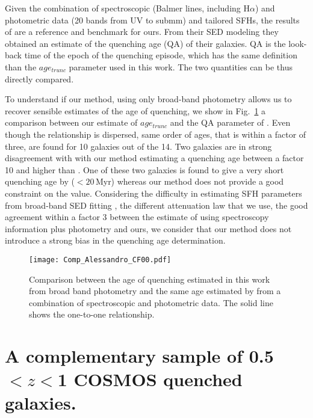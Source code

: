 \documentclass[traditabstract]{aa} %
\begin{document}
Given the combination of spectroscopic (Balmer lines, including H$\alpha$) and photometric data (20 bands from UV to submm) and tailored SFHs, the results of \cite{Boselli16} are a reference and benchmark for ours.
From their SED modeling they obtained an estimate of the quenching age (QA) of their galaxies.
QA is the look-back time of the epoch of the quenching episode, which has the same definition than the $age_{trunc}$ parameter used in this work.
The two quantities can be thus directly compared.

To understand if our method, using only broad-band photometry allows us to recover sensible estimates of the age of quenching, we show in Fig.~\ref{comp_al} a comparison between our estimate of $age_{trunc}$ and the QA parameter of \cite{Boselli16}.
Even though the relationship is dispersed, same order of ages, that is within a factor of three, are found for 10 galaxies out of the 14.
Two galaxies are in strong disagreement with \cite{Boselli16} with our method estimating a quenching age between a factor 10 and higher than \cite{Boselli16}.
One of these two galaxies is found to give a very short quenching age by \cite{Boselli16} ($<20$\,Myr) whereas our method does not provide a good constraint on the value.
Considering the difficulty in estimating SFH parameters from broad-band SED fitting \citep[e.g.][]{Pforr12,Buat14,Ciesla15,Ciesla16}, the different attenuation law that we use, the good agreement within a factor 3 between the estimate of \cite{Boselli16} using spectroscopy information plus photometry and ours, we consider that our method does not introduce a strong bias in the quenching age determination.


\begin{figure}[!h] 
  	\texttt{[image: Comp\_Alessandro\_CF00.pdf]}
  	\caption{\label{comp_al} Comparison between the age of quenching estimated in this work from broad band photometry and the same age estimated by \cite{Boselli16} from a combination of spectroscopic and photometric data. The solid line shows the one-to-one relationship.}
\end{figure}

\section{\label{cosmos}A complementary sample of 0.5$<z<$1 COSMOS quenched galaxies.}
\end{document}
